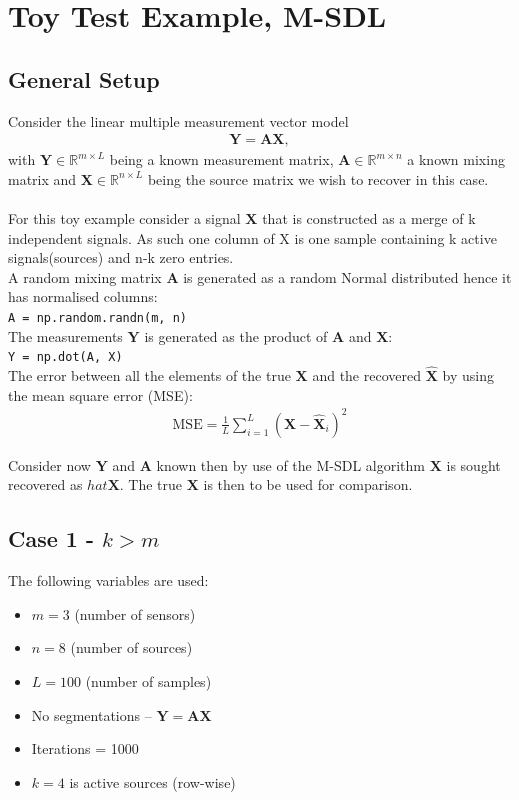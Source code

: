 \section{Toy Test Example, M-SDL}
\subsection*{General Setup}
Consider the linear multiple measurement vector model
\begin{align*}
\mathbf{Y} = \mathbf{AX},
\end{align*}
with $\mathbf{Y} \in \mathbb{R}^{m \times L}$ being a known measurement matrix, $\mathbf{A} \in \mathbb{R}^{m \times n}$ a known mixing matrix and $\mathbf{X} \in \mathbb{R}^{n \times L}$ being the source matrix we wish to recover in this case.
\\ \\
For this toy example consider a signal $\textbf{X}$ that is constructed as a merge of k independent signals. As such one column of X is one sample containing k active signals(sources) and n-k zero entries.\\
A random mixing matrix $\textbf{A}$ is generated as a random Normal distributed hence it has normalised columns:\\
\texttt{A = np.random.randn(m, n)  }  \\             
The measurements $\textbf{Y}$ is generated as the product of $\textbf{A}$ and $\textbf{X}$:\\
\texttt{Y = np.dot(A, X)}    \\ 
The error between all the elements of the true $\mathbf{X}$ and the recovered $\hat{\mathbf{X}}$ by using the mean square error (MSE):
\begin{align*}
\text{MSE} = \frac{1}{L} \sum_{i=1}^L (\mathbf{X} - \hat{\mathbf{X}}_i)^2
\end{align*}

Consider now $\textbf{Y}$ and $\textbf{A}$ known then by use of the M-SDL algorithm $\textbf{X}$ is sought recovered as $hat{\textbf{X}}$. The true $\textbf{X}$ is then to be used for comparison. 
\subsection*{Case 1 - $k>m$}
The following variables are used: 
\begin{itemize}
\item $m = 3$ (number of sensors)
\item $n = 8$ (number of sources)
\item $L = 100$ (number of samples)
\item No segmentations -- $\mathbf{Y} = \mathbf{AX}$
\item Iterations = 1000
\item $k = 4$ is active sources (row-wise) 
\end{itemize}


